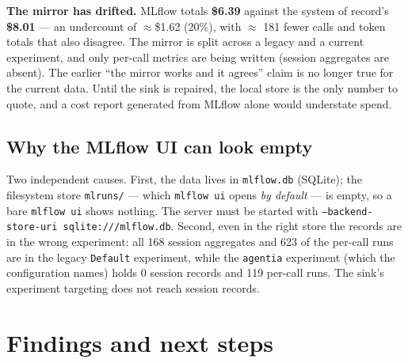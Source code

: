 \documentclass[11pt,a4paper]{article}
\begin{document}
\begin{notebox}[colframe=warn]
\textbf{The mirror has drifted.} MLflow totals \textbf{\$6.39} against the system of
record's \textbf{\$8.01} --- an undercount of $\approx$\$1.62 (20\%), with $\approx$ 181 fewer
calls and token totals that also disagree. The mirror is split across a legacy and a
current experiment, and only per-call metrics are being written (session aggregates
are absent). The earlier ``the mirror works and it agrees'' claim is no longer true
for the current data. Until the sink is repaired, the local store is the only number
to quote, and a cost report generated from MLflow alone would understate spend.
\end{notebox}

\subsection{Why the MLflow UI can look empty}

Two independent causes. First, the data lives in \texttt{mlflow.db} (SQLite); the
filesystem store \texttt{mlruns/} --- which \texttt{mlflow ui} opens \emph{by
default} --- is empty, so a bare \texttt{mlflow ui} shows nothing. The server must be
started with \texttt{--backend-store-uri sqlite:///mlflow.db}. Second, even in the
right store the records are in the wrong experiment: all 168 session aggregates and
623 of the per-call runs are in the legacy \texttt{Default} experiment, while the
\texttt{agentia} experiment (which the configuration names) holds 0 session records
and 119 per-call runs. The sink's experiment targeting does not reach session records.

\section{Findings and next steps}
\label{sec:findings}
\end{document}
